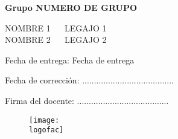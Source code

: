 
\begin{titlepage}
\centering

{ \large \universidad \par }
\vspace{2cm}
{\Large \scshape \materia \par}
\vspace{2cm}
{\Huge \scshape \titulo \par }
\vspace{1cm}
{\large \bf Grupo NUMERO DE GRUPO \par} %
\vspace{0cm}
\textsc{\large 
        NOMBRE 1 ~~ LEGAJO 1\\ %
        NOMBRE 2 ~~ LEGAJO 2}  %
\vspace{2cm}
{\par \large Fecha de entrega: Fecha de entrega \par}  %
\vspace{1cm}
{\large Fecha de corrección: .......................................\par}
\vspace{1.5cm}
{\large Firma del docente: .......................................}
\vspace{2.5cm}
\begin{figure}[htb!]
\centering
\texttt{[image: \\logofac]}
\end{figure}
\end{titlepage}